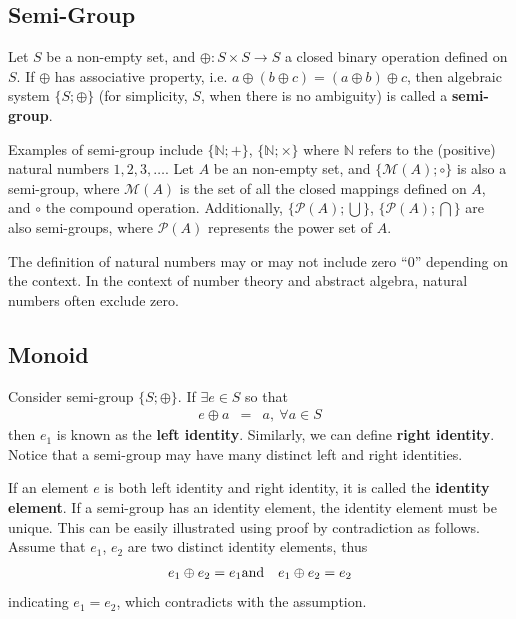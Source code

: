 \subsection{Semi-Group}

Let $S$ be a non-empty set, and $\oplus: S\times S \rightarrow S$ a closed binary operation defined on $S$. If $\oplus$ has associative property, i.e. $a\oplus(b\oplus c) = (a \oplus b) \oplus c$, then algebraic system $\{S; \oplus\}$ (for simplicity, $S$, when there is no ambiguity) is called a \textbf{semi-group}.

Examples of semi-group include $\{\mathbb{N}; +\}$, $\{\mathbb{N}; \times\}$ where $\mathbb{N}$ refers to the (positive) natural numbers $1, 2, 3, \ldots$. Let $A$ be an non-empty set, and $\{\mathcal{M}(A); \circ\}$ is also a semi-group, where $\mathcal{M}(A)$ is the set of all the closed mappings defined on $A$, and $\circ$ the compound operation. Additionally, $\{\mathcal{P}(A); \bigcup\}$, $\{\mathcal{P}(A); \bigcap\}$ are also semi-groups, where $\mathcal{P}(A)$ represents the power set of $A$.

\begin{shortbox}
The definition of natural numbers may or may not include zero ``$0$'' depending on the context. In the context of number theory and abstract algebra, natural numbers often exclude zero.
\end{shortbox}

\subsection{Monoid}

Consider semi-group $\{S; \oplus\}$. If $\exists e\in S$ so that
\begin{eqnarray}
	e\oplus a &=& a, ~\forall a \in S \nonumber
\end{eqnarray}
then $e_1$ is known as the \textbf{left identity}. Similarly, we can define \textbf{right identity}. Notice that a semi-group may have many distinct left and right identities.

If an element $e$ is both left identity and right identity, it is called the \textbf{identity element}. If a semi-group has an identity element, the identity element must be unique. This can be easily illustrated using proof by contradiction as follows. Assume that $e_1$, $e_2$ are two distinct identity elements, thus
\begin{eqnarray}
	e_1\oplus e_2 = e_1 &\textup{and}& e_1\oplus e_2 = e_2 \nonumber
\end{eqnarray}
indicating $e_1=e_2$, which contradicts with the assumption.

